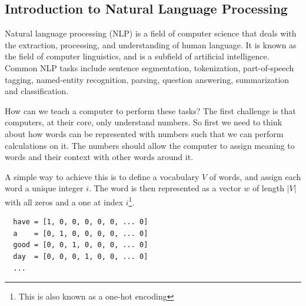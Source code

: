 \subsection{Introduction to Natural Language Processing}

Natural language processing (NLP) is a field of computer science that deals with the extraction, processing, and understanding of human language.
It is known as the field of computer linguistics, and is a subfield of artificial intelligence.
Common NLP tasks include sentence segmentation, tokenization, part-of-speech tagging, named-entity recognition, parsing, question answering, summarization and classification.

How can we teach a computer to perform these tasks?
The first challenge is that computers, at their core, only understand numbers.
So first we need to think about how words can be represented with numbers such that we can perform calculations on it.
The numbers should allow the computer to assign meaning to words and their context with other words around it.

A simple way to achieve this is to define a vocabulary $V$ of words, and assign each word a unique integer $i$.
The word is then represented as a vector $w$ of length $|V|$ with all zeros and a one at index $i$\footnote{This is also known as a one-hot encoding}.
\begin{verbatim}
  have = [1, 0, 0, 0, 0, 0, ... 0]
  a    = [0, 1, 0, 0, 0, 0, ... 0]
  good = [0, 0, 1, 0, 0, 0, ... 0]
  day  = [0, 0, 0, 1, 0, 0, ... 0]
  ...
\end{verbatim}

